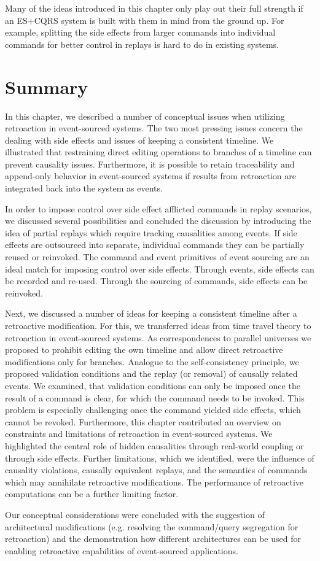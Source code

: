 Many of the ideas introduced in this chapter only play out their full strength 
if an ES+CQRS system is built with them in mind from the ground up. For example, 
splitting the side effects from larger commands into individual commands for 
better control in replays is hard to do in existing systems.

\section{Summary}
In this chapter, we described a number of conceptual issues when utilizing 
retroaction in event-sourced systems. The two most pressing issues concern the 
dealing with side effects and issues of keeping a consistent timeline.
We illustrated that restraining direct editing operations to branches of
a timeline can prevent causality issues. Furthermore, it is possible to retain 
traceability and append-only behavior in event-sourced systems if results from 
retroaction are integrated back into the system as events.

In order to impose control over side effect afflicted commands in replay
scenarios, we discussed several possibilities and concluded the discussion
by introducing the idea of partial replays which require tracking causalities 
among events. If side effects are outsourced into separate, individual commands 
they can be partially reused or reinvoked.
The command and event primitives of event sourcing are an ideal match for 
imposing control over side effects. Through events, side effects can be 
recorded and re-used. Through the sourcing of commands, side effects can be 
reinvoked.

Next, we discussed a number of ideas for keeping a consistent timeline after a
retroactive modification. For this, we transferred ideas from time travel 
theory to retroaction in event-sourced systems. As correspondences to parallel 
universes we proposed to prohibit editing the own timeline and allow direct 
retroactive modifications only for branches.
Analogue to the  self-consistency principle, we proposed validation conditions 
and the replay (or removal) of causally related events. 
We examined, that validation conditions can only be imposed once the result 
of a command is clear, for which the command needs to be invoked.
This problem is especially challenging once the command yielded side effects,
which cannot be revoked.
%
Furthermore, this chapter contributed an overview on constraints and limitations 
of retroaction in event-sourced systems. We highlighted the central role of 
hidden causalities through real-world coupling or through side effects. Further 
limitations, which we identified, were the influence of causality violations, 
causally equivalent replays, and the semantics of commands which may annihilate
retroactive modifications. The performance of retroactive computations can be a 
further limiting factor.

Our conceptual considerations were concluded with the suggestion of architectural 
modifications (e.g. resolving the command/query segregation for retroaction) and 
the demonstration how different architectures can be used for enabling retroactive 
capabilities of event-sourced applications.
